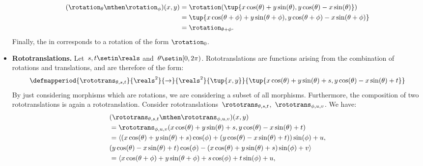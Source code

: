 \begin{solution}
\begin{itemize}
\begin{equation}
\begin{aligned}
                      (\rotation_{\theta}\mthen \rotation_{\phi})(x,y)
                       & =\rotation(\tup{x\cos(\theta)+y\sin(\theta), y\cos(\theta)-x\sin(\theta)}) \\
                       & =\tup{x\cos(\theta+\phi)+y\sin(\theta+\phi), y\cos(\theta+\phi)-x\sin(\theta+\phi)} \\
                       & =\rotation_{\theta+\phi}.
                  \end{aligned}
              \end{equation}
              Finally, the  in \Draw corresponds to a rotation of the form $\rotation_{0}$.
        \item \textbf{Rototranslations.}
              Let~$s,t\setin \reals$ and~$\theta \setin [0,2\pi)$.
              Rototranslations are functions arising from the combination of rotations and translations, and are therefore of the form:
              \begin{equation}
                  \defmapperiod{
                      \rototrans_{\theta,s,t}
                  }{
                      \reals^2
                  }{
                      \to
                  }{
                      \reals^2
                  }{
                      \tup{x,y}
                  }{
                      \tup{x\cos(\theta)+y\sin(\theta)+s, y\cos(\theta)-x\sin(\theta)+t}
                  }
              \end{equation}
              By just considering morphisms which are rotations, we are considering a subset of all morphisms.
              Furthermore, the composition of two rototranslations is again a rototranslation.
              Consider rototranslations~$\rototrans_{\theta,s,t}$,~$\rototrans_{\phi,u,v}$.
              We have:
              \begin{equation}
                  \begin{aligned}
                       & (\rototrans_{\theta,s,t}\mthen \rototrans_{\phi,u,v})(x,y) \\
                       & =\rototrans_{\phi,u,v}(x\cos(\theta)+y\sin(\theta)+s, y\cos(\theta)-x\sin(\theta)+t) \\
                       & =\langle(x\cos(\theta)+y\sin(\theta)+s)\cos(\phi)+(y\cos(\theta)-x\sin(\theta)+t))\sin(\phi)+u, \\
                       & (y\cos(\theta)-x\sin(\theta)+t)\cos(\phi) - (x\cos(\theta)+y\sin(\theta)+s)\sin(\phi)+v\rangle \\
                       & =\langle x\cos(\theta+\phi)+y\sin(\theta+\phi)+s\cos(\phi)+t\sin(\phi)+u, \\

\end{aligned}
\end{equation}
\end{itemize}
\end{solution}
